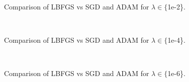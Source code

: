 \documentclass[11pt]{report}
\begin{document}
\begin{figure}[!htb]
\centering
{}
~~
~~
\caption{Comparison of LBFGS vs SGD and ADAM for $\lambda \in \{${\sf 1e-2}\}.}
\label{fig:compare_sgd}
\end{figure}

\begin{figure}[!htb]
\centering
{}
~~
~~
\caption{Comparison of LBFGS vs SGD and ADAM for $\lambda \in \{${\sf 1e-4}\}.}
\label{fig:compare_sgd}
\end{figure}

\begin{figure}[!htb]
\centering
{}
~~
~~
\caption{Comparison of LBFGS vs SGD and ADAM for $\lambda \in \{${\sf 1e-6}\}.}
\label{fig:compare_sgd}
\end{figure}
\end{document}
